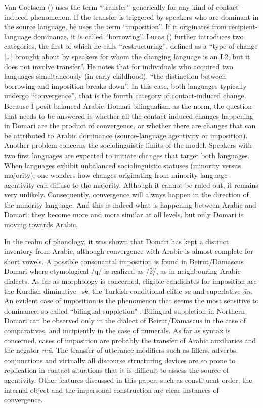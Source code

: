 \documentclass[output=paper]{langsci/langscibook}
\begin{document}
Van Coetsem (\citeyear{VanCoetsem1988,VanCoetsem2000}) uses the term “transfer” generically for any kind of contact-induced phenomenon. If the transfer is triggered by speakers who are dominant in the source language, he uses the term “imposition”. If it originates from recipient-language dominance, it is called “borrowing”. Lucas (\citeyear[525]{Lucas2015}) further introduces two categories, the first of which he calls ``restructuring'', defined as a “type of change […] brought about by speakers for whom the changing language is an L2, but it does not involve transfer”.  He notes that for individuals who acquired two languages simultaneously (in early childhood), “the distinction between borrowing and imposition breaks down”. In this case, both languages typically undergo ``convergence'', that is the fourth category of contact-induced change. Because I posit balanced Arabic--Domari bilingualism as the norm, the question that needs to be answered is whether all the contact-induced changes happening in Domari are the product of convergence, or whether there are changes that can be attributed to Arabic dominance (source-language agentivity or imposition). Another problem concerns the sociolinguistic limits of the model. Speakers with two first languages are expected to initiate changes that target both languages. When languages exhibit unbalanced sociolinguistic statuses (minority versus majority), one wonders how changes originating from minority language agentivity can diffuse to the majority. Although it cannot be ruled out, it remains very unlikely. Consequently, convergence will always happen in the direction of the minority language. And this is indeed what is happening between Arabic and Domari: they become more and more similar at all levels, but only Domari is moving towards Arabic.

In the realm of phonology, it was shown that Domari has kept a distinct inventory from Arabic, although convergence with Arabic is almost complete for short vowels. A possible consonantal imposition is found in Beirut/Damascus Domari where etymological /q/ is realized as /ʔ/, as in neighbouring Arabic dialects. As far as morphology is concerned, eligible candidates for imposition are the Kurdish diminutive \textit{{}-ək}, the Turkish conditional clitic \textit{sa} and superlative \textit{ān}. An evident case of imposition is the phenomenon that seems the most sensitive to dominance: so-called ``bilingual suppletion" \citep{Matras2012}. Bilingual suppletion in Northern Domari can be observed only in the dialect of Beirut/Damascus in the case of comparatives, and incipiently in the case of numerals. As far as syntax is concerned, cases of imposition are probably the transfer of Arabic auxiliaries and the negator \textit{mū}. The transfer of utterance modifiers such as fillers, adverbs, conjunctions and virtually all discourse structuring devices are so prone to replication in contact situations \citep{Matras1998} that it is difficult to assess the source of agentivity. Other features discussed in this paper, such as constituent order, the internal object and the impersonal construction are clear instances of convergence.
\end{document}
